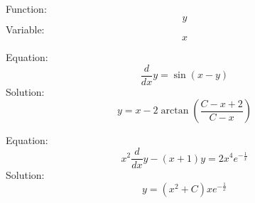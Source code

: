 \documentclass{article}
\begin{document}
Function:
$$
y
$$
Variable:
$$
x
$$


Equation:
$$
\frac{d}{dx}y=\sin(x-y)
$$
Solution:
$$
y=x-2 \arctan(\frac{C-x+2}{C-x})
$$

Equation:
$$
x^2 \frac{d}{dx}y-(x+1)y=2x^4 e^{-\frac{1}{x}}
$$
Solution:
$$
y=(x^2+C)xe^{-\frac{1}{x}}
$$
\end{document}
